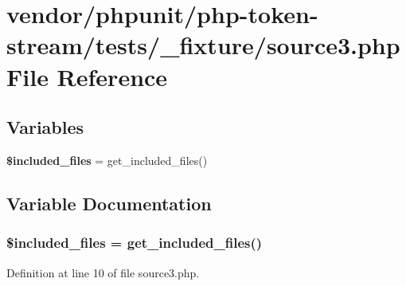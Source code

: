 \section{vendor/phpunit/php-\/token-\/stream/tests/\+\_\+fixture/source3.php File Reference}
\label{source3_8php}
\subsection*{Variables}
\begin{DoxyCompactItemize}
\item 
{\bf \$included\+\_\+files} = get\+\_\+included\+\_\+files()
\end{DoxyCompactItemize}


\subsection{Variable Documentation}
\subsubsection[{\$included\+\_\+files}]{\setlength{\rightskip}{0pt plus 5cm}\$included\+\_\+files = get\+\_\+included\+\_\+files()}\label{source3_8php_af3b2ca98a510c4e55d6cea25f1000c19}


Definition at line 10 of file source3.\+php.

